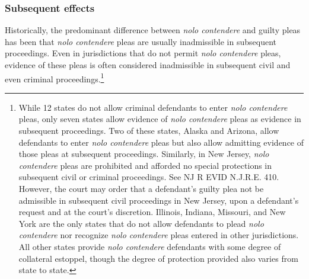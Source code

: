 \subsubsection{Subsequent effects}

Historically, the predominant difference between \textit{nolo contendere} and guilty pleas has been that \textit{nolo contendere} pleas are usually inadmissible in subsequent proceedings. Even in jurisdictions that do not permit \textit{nolo contendere} pleas, evidence of these pleas is often considered inadmissible in subsequent civil and even criminal proceedings.\footnote{While 12 states do not allow criminal defendants to enter \textit{nolo contendere} pleas, only seven states allow evidence of \textit{nolo contendere} pleas as evidence in subsequent proceedings. Two of these states, Alaska and Arizona, allow defendants to enter \textit{nolo contendere} pleas but also allow admitting evidence of those pleas at subsequent proceedings. Similarly, in New Jersey, \textit{nolo contendere} pleas are prohibited and afforded no special protections in subsequent civil or criminal proceedings. See NJ R EVID N.J.R.E. 410. However, the court may order that a defendant's guilty plea not be admissible in subsequent civil proceedings in New Jersey, upon a defendant's request and at the court's discretion. Illinois, Indiana, Missouri, and New York are the only states that do not allow defendants to plead \textit{nolo contendere} nor recognize \textit{nolo contendere} pleas entered in other jurisdictions. All other states provide \textit{nolo contendere} defendants with some degree of collateral estoppel, though the degree of protection provided also varies from state to state.} 

